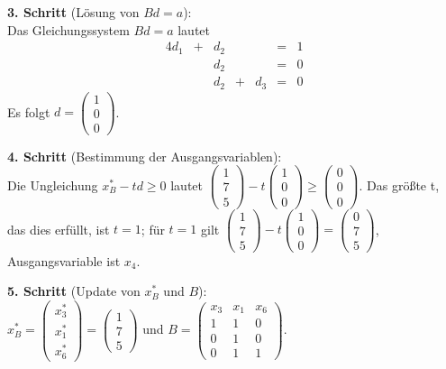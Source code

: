 \documentclass[10pt,a4paper,oneside,ngerman,numbers=noenddot]{scrartcl}
\begin{document}
		\textbf{3. Schritt} (Lösung von $Bd = a$):\\
		Das Gleichungssystem $Bd = a$ lautet
		\begin{alignat*}{4}
			d_{1} &+& d_{2} && &=& 1 \\
			&& d_{2} && &=& 0 \\
			&& d_{2} &+& d_{3} &=& 0
		\end{alignat*}
		Es folgt $d = \begin{pmatrix}1 \\ 0 \\ 0 \end{pmatrix}$.
		
		\textbf{4. Schritt} (Bestimmung der Ausgangsvariablen):\\
		Die Ungleichung $x_{B}^{*} - td \geq 0$ lautet $\begin{pmatrix} 1 \\ 7 \\ 5\end{pmatrix} - t \begin{pmatrix}1 \\ 0 \\ 0 \end{pmatrix} \geq \begin{pmatrix} 0 \\ 0 \\ 0 \end{pmatrix}$. Das größte t, das dies erfüllt, ist $t = 1$; für $t = 1$ gilt $\begin{pmatrix} 1 \\ 7 \\ 5\end{pmatrix} - t \begin{pmatrix}1 \\ 0 \\ 0 \end{pmatrix} = \begin{pmatrix} 0 \\ 7 \\ 5 \end{pmatrix}$, Ausgangsvariable ist $x_{4}$.
		
		\textbf{5. Schritt} (Update von $x_{B}^{*}$ und $B$):\\
		$x_{B}^{*} = \begin{pmatrix} x_{3}^{*} \\ x_{1}^{*} \\ x_{6}^{*} \end{pmatrix} = \begin{pmatrix} 1 \\ 7 \\ 5 \end{pmatrix}$ und $B = \begin{pmatrix} x_{3} & x_{1} & x_{6} \\ 1 & 1 & 0 \\ 0 & 1 & 0 \\ 0 & 1 & 1 \end{pmatrix}$.
		
\end{document}
